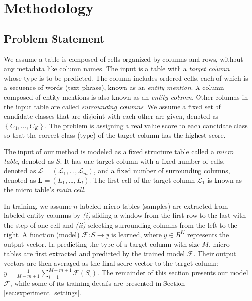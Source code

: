 \documentclass{article}
\begin{document}
\section{Methodology}

\subsection{Problem Statement}\label{sec:problem_statement}

We assume a table is composed of cells organized by columns and rows, 
without any metadata like column names.
The input is a table with a \textit{target column} whose type is to be predicted.
The column includes ordered cells, 
each of which is a sequence of words (text phrase), known as an \textit{entity mention}.
A column composed of entity mentions is also known as an \textit{entity column}.
Other columns in the input table are called \textit{surrounding columns}.
We assume a fixed set of candidate classes that are disjoint with each other are given, denoted as $\left\{C_1, ..., C_K \right\}$.
The problem is assigning a real value score to each candidate class so that the correct class (type) of the target column has the highest score.


The input of our method is modeled as a fixed structure table called a \textit{micro table}, denoted as $S$.
It has one target column with a fixed number of cells, denoted as $\mathcal{L} = (\mathcal{L}_{1}, ..., \mathcal{L}_{m} )$,
and a fixed number of surrounding columns, denoted as $\bm{L} = ( L_{1}, ..., L_{l} )$.
The first cell of the target column $\mathcal{L}_1$ is known as the micro table's \textit{main cell}.

In training,
we assume $n$ labeled micro tables (samples) are 
extracted from labeled entity columns by \textit{(i)} sliding a window from the first row to the last with the step of one cell and \textit{(ii)} selecting surrounding columns from the left to the right.
A function (model) $\mathcal{F}: S \rightarrow y$ is learned, 
where $y \in R^K$ represents the output vector. 
In predicting the type of a target column with size $M$, 
micro tables are first extracted 
and predicted by the trained model $\mathcal{F}$. 
Their output vectors are then averaged as the final score vector to the target column: 
$\bar{y} = \frac{1}{M-m+1} \sum_{i=1}^{M-m+1} \mathcal{F}(S_i)$.
The remainder of this section presents our model $\mathcal{F}$, 
while some of its training details are presented in Section \ref{sec:experiment_settings}.
\end{document}
